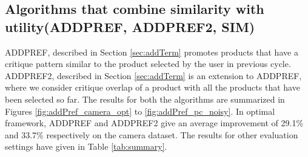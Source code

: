 \subsection{Algorithms that combine similarity with utility(ADDPREF, ADDPREF2, SIM)}
ADDPREF, described in Section \ref{sec:addTerm} promotes products that have a critique pattern similar to the product selected by the user in previous cycle.
ADDPREF2, described in Section \ref{sec:addTerm} is an extension to ADDPREF, where we consider critique overlap of a product with all the products that have been selected so far.
The results for both the algorithms are summarized in Figures \ref{fig:addPref_camera_opt} to \ref{fig:addPref_pc_noisy}.
In optimal framework, ADDPREF and ADDPREF2 give an average improvement of 29.1\% and 33.7\% respectively on the camera dataset.
The results for other evaluation settings have given in Table \ref{tab:summary}.

